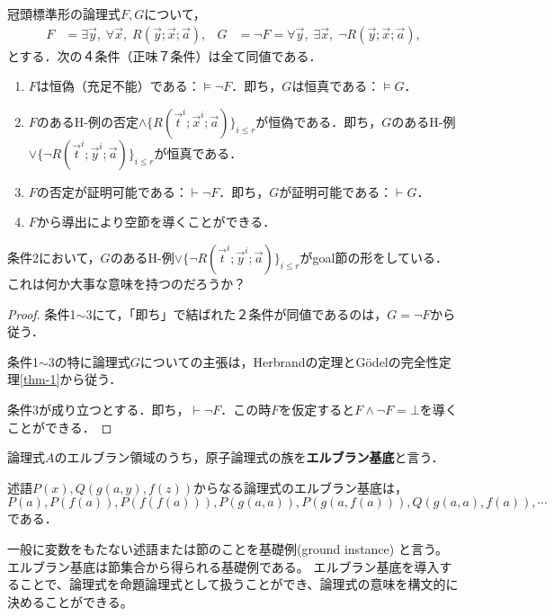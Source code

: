 \documentclass[uplatex, dvipdfmx]{jsreport}
\begin{document}
\begin{corollary}\label{cor-Herbrand}
    冠頭標準形の論理式$F,G$について，
    \begin{align*}
        F&=\exists\vec{y},\;\forall\vec{x},\;R(\vec{y};\vec{x};\vec{a}),& G&=\lnot F=\forall\vec{y},\;\exists\vec{x},\;\lnot R(\vec{y};\vec{x};\vec{a}),
    \end{align*}
    とする．次の４条件（正味７条件）は全て同値である．
    \begin{enumerate}
        \item $F$は恒偽（充足不能）である：$\vDash\lnot F$．即ち，$G$は恒真である：$\vDash G$．
        \item $F$のあるH-例の否定$\land\{R(\vec{t}^i;\vec{x}^i;\vec{a})\}_{i\le r}$が恒偽である．即ち，$G$のあるH-例$\lor\{\lnot R(\vec{t}^i;\vec{y}^i;\vec{a})\}_{i\le r}$が恒真である．
        \item $F$の否定が証明可能である：$\vdash\lnot F$．即ち，$G$が証明可能である：$\vdash G$．
        \item $F$から導出により空節を導くことができる．
    \end{enumerate}
\end{corollary}
\begin{remark}
    条件2において，$G$のあるH-例$\lor\{\lnot R(\vec{t}^i;\vec{y}^i;\vec{a})\}_{i\le r}$がgoal節の形をしている．
    これは何か大事な意味を持つのだろうか？
\end{remark}
\begin{proof}
    条件1$\sim$3にて，「即ち」で結ばれた２条件が同値であるのは，$G=\lnot F$から従う．

    条件1$\sim$3の特に論理式$G$についての主張は，Herbrandの定理とGödelの完全性定理\ref{thm-1}から従う．

    条件3が成り立つとする．即ち，$\vdash\lnot F$．この時$F$を仮定すると$F\land\lnot F=\bot$を導くことができる．
\end{proof}

\begin{definition}
    論理式$A$のエルブラン領域のうち，原子論理式の族を\textbf{エルブラン基底}と言う．
\end{definition}
\begin{example}
    述語$P(x),Q(g(a,y),f(z))$からなる論理式のエルブラン基底は，
    \[P(a),P(f(a)),P(f(f(a))),P(g(a,a)),P(g(a,f(a))),Q(g(a,a),f(a)),\cdots\]である．
\end{example}
\begin{remark}
    一般に変数をもたない述語または節のことを基礎例(ground instance) と言う。
    エルブラン基底は節集合から得られる基礎例である。
    エルブラン基底を導入することで、論理式を命題論理式として扱うことができ、論理式の意味を構文的に決めることができる。
\end{remark}
\end{document}
